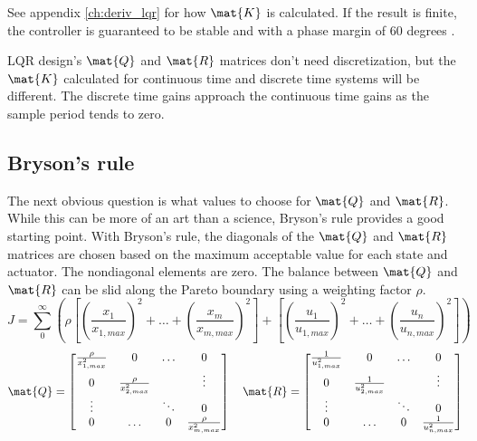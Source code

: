 See appendix \ref{ch:deriv_lqr} for how $\mat{K}$ is calculated. If the result
is finite, the controller is guaranteed to be stable and
 with a \gls{phase margin} of 60 degrees
\cite{bib:lqr_phase_margin}.
\begin{remark}
  LQR design's $\mat{Q}$ and $\mat{R}$ matrices don't need \gls{discretization},
  but the $\mat{K}$ calculated for continuous time and discrete time
  \glspl{system} will be different. The discrete time gains approach the
  continuous time gains as the sample period tends to zero.
\end{remark}

\subsection{Bryson's rule}

The next obvious question is what values to choose for $\mat{Q}$ and $\mat{R}$.
While this can be more of an art than a science, Bryson's rule provides a good
starting point. With Bryson's rule, the diagonals of the $\mat{Q}$ and $\mat{R}$
matrices are chosen based on the maximum acceptable value for each \gls{state}
and actuator. The nondiagonal elements are zero. The balance between $\mat{Q}$
and $\mat{R}$ can be slid along the Pareto boundary using a weighting factor
$\rho$.
\begin{equation*}
  J = \sum_0^\infty \left(\rho \left[
    \left(\frac{x_1}{x_{1,max}}\right)^2 + \ldots +
    \left(\frac{x_m}{x_{m,max}}\right)^2\right] + \left[
    \left(\frac{u_1}{u_{1,max}}\right)^2 + \ldots +
    \left(\frac{u_n}{u_{n,max}}\right)^2\right]\right)
\end{equation*}
\begin{equation*}
  \mat{Q} = \begin{bmatrix}
    \frac{\rho}{x_{1,max}^2} & 0 & \ldots & 0 \\
    0 & \frac{\rho}{x_{2,max}^2} & & \vdots \\
    \vdots & & \ddots & 0 \\
    0 & \ldots & 0 & \frac{\rho}{x_{m,max}^2}
  \end{bmatrix}
  \quad
  \mat{R} = \begin{bmatrix}
    \frac{1}{u_{1,max}^2} & 0 & \ldots & 0 \\
    0 & \frac{1}{u_{2,max}^2} & & \vdots \\
    \vdots & & \ddots & 0 \\
    0 & \ldots & 0 & \frac{1}{u_{n,max}^2}
  \end{bmatrix}
\end{equation*}

